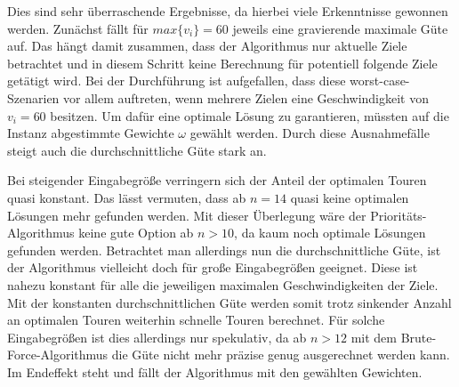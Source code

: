 \documentclass[german,version-2019-11]{uzl-thesis}
\begin{document}
\begin{table}[htpb]
\centering
{}
\caption{Güte des Prioritäts-Algorithmus}
\label{tab:ExpGüte}
\end{table}

Dies sind sehr überraschende Ergebnisse, da hierbei viele Erkenntnisse gewonnen werden. Zunächst fällt für $max\{v_i\}=60$ jeweils eine gravierende maximale Güte auf. Das hängt damit zusammen, dass der Algorithmus nur aktuelle Ziele betrachtet und in diesem Schritt keine Berechnung für potentiell folgende Ziele getätigt wird. Bei der Durchführung ist aufgefallen, dass diese worst-case-Szenarien vor allem auftreten, wenn mehrere Zielen eine Geschwindigkeit von $v_i=60$ besitzen. Um dafür eine optimale Lösung zu garantieren, müssten auf die Instanz abgestimmte Gewichte $\omega$ gewählt werden. Durch diese Ausnahmefälle steigt auch die durchschnittliche Güte stark an. 

Bei steigender Eingabegröße verringern sich der Anteil der optimalen Touren quasi konstant. Das lässt vermuten, dass ab $n=14$ quasi keine optimalen Lösungen mehr gefunden werden. Mit dieser Überlegung wäre der Prioritäts-Algorithmus keine gute Option ab $n>10$, da kaum noch optimale Lösungen gefunden werden. Betrachtet man allerdings nun die durchschnittliche Güte, ist der Algorithmus vielleicht doch für große Eingabegrößen geeignet. Diese ist nahezu konstant für alle die jeweiligen maximalen Geschwindigkeiten der Ziele. Mit der konstanten durchschnittlichen Güte werden somit trotz sinkender Anzahl an optimalen Touren weiterhin schnelle Touren berechnet. Für solche Eingabegrößen ist dies allerdings nur spekulativ, da ab $n>12$ mit dem Brute-Force-Algorithmus die Güte nicht mehr präzise genug ausgerechnet werden kann. Im Endeffekt steht und fällt der Algorithmus mit den gewählten Gewichten.
\end{document}
